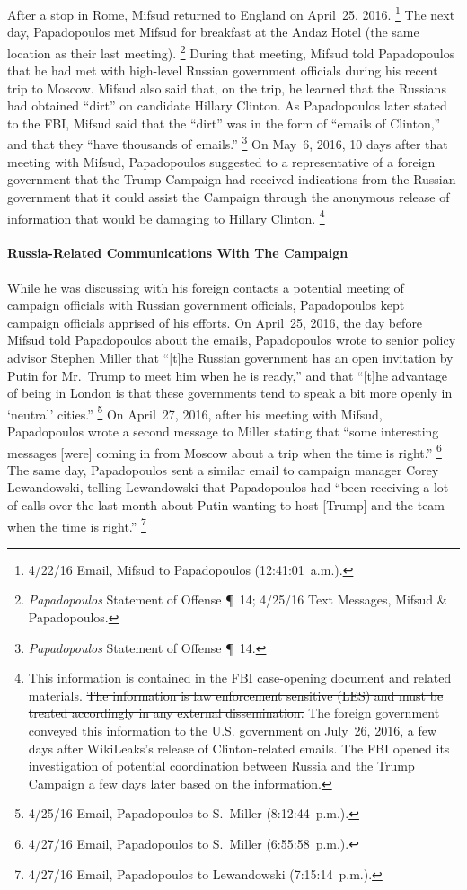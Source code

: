 After a stop in Rome, Mifsud returned to England on April~25, 2016.%
\footnote{4/22/16 Email, Mifsud to Papadopoulos (12:41:01~a.m.).}
The next day, Papadopoulos met Mifsud for breakfast at the Andaz Hotel (the same location as their last meeting).%
\footnote{\textit{Papadopoulos} Statement of Offense \P~14;
4/25/16 Text Messages, Mifsud \& Papadopoulos.}
During that meeting, Mifsud told Papadopoulos that he had met with high-level Russian government officials during his recent trip to Moscow.
Mifsud also said that, on the trip, he learned that the Russians had obtained ``dirt'' on candidate Hillary Clinton.
As Papadopoulos later stated to the FBI, Mifsud said that the ``dirt'' was in the form of ``emails of Clinton,'' and that they ``have thousands of emails.''%
\footnote{\textit{Papadopoulos} Statement of Offense \P~14.}
On May~6, 2016, 10 days after that meeting with Mifsud, Papadopoulos suggested to a representative of a foreign government that the Trump Campaign had received indications from the Russian government that it could assist the Campaign through the anonymous release of information that would be damaging to Hillary Clinton.%
\footnote{\label{fnFourSixFive}This information is contained in the FBI case-opening document and related materials.
\sout{The information is law enforcement sensitive (LES) and must be treated accordingly in any external dissemination.}
The foreign government conveyed this information to the U.S. government on July~26, 2016, a few days after WikiLeaks's release of Clinton-related emails.
The FBI opened its investigation of potential coordination between Russia and the Trump Campaign a few days later based on the information.}

\paragraph{Russia-Related Communications With The Campaign}

While he was discussing with his foreign contacts a potential meeting of campaign officials with Russian government officials, Papadopoulos kept campaign officials apprised of his efforts.
On April~25, 2016, the day before Mifsud told Papadopoulos about the emails, Papadopoulos wrote to senior policy advisor Stephen Miller that ``[t]he Russian government has an open invitation by Putin for Mr.~Trump to meet him when he is ready,'' and that ``[t]he advantage of being in London is that these governments tend to speak a bit more openly in `neutral' cities.''%
\footnote{4/25/16 Email, Papadopoulos to S.~Miller (8:12:44~p.m.).}
On April~27, 2016, after his meeting with Mifsud, Papadopoulos wrote a second message to Miller stating that ``some interesting messages [were] coming in from Moscow about a trip when the time is right.''%
\footnote{4/27/16 Email, Papadopoulos to S.~Miller (6:55:58~p.m.).}
The same day, Papadopoulos sent a similar email to campaign manager Corey Lewandowski, telling Lewandowski that Papadopoulos had ``been receiving a lot of calls over the last month about Putin wanting to host [Trump] and the team when the time is right.''%
\footnote{4/27/16 Email, Papadopoulos to Lewandowski (7:15:14~p.m.).}

